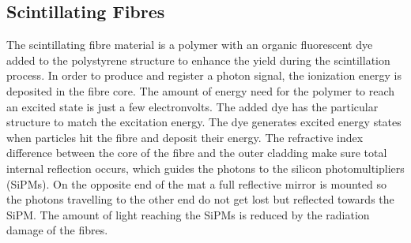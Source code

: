\subsection{Scintillating Fibres}
The scintillating fibre material is a polymer with an organic fluorescent dye
added to the polystyrene structure to enhance the yield during the scintillation process.
In order to produce and register a photon signal, the ionization energy is deposited
in the fibre core. The amount of energy need for the polymer to reach an
excited state is just a few electronvolts. The added dye has the particular structure
to match the excitation energy. The dye generates excited energy states when
particles hit the fibre and deposit their energy.
The refractive index difference between the core of the fibre and the outer cladding make sure total internal reflection occurs, which guides the photons to the silicon photomultipliers (SiPMs).
On the opposite end of the mat a full reflective mirror is mounted so the photons travelling to the other end do not get lost but reflected towards the SiPM.
The amount of light reaching the SiPMs is reduced by the radiation damage of the fibres.

